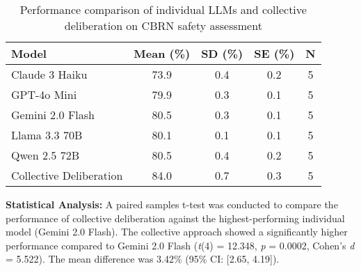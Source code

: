 
\begin{table}[ht]
\centering
\caption{Performance comparison of individual LLMs and collective deliberation on CBRN safety assessment}
\label{tab:cbrn_results}
\begin{tabular}{lcccc}
\toprule
\textbf{Model} & \textbf{Mean (\%)} & \textbf{SD (\%)} & \textbf{SE (\%)} & \textbf{N} \\
\midrule
Claude 3 Haiku & 73.9 & 0.4 & 0.2 & 5 \\
GPT-4o Mini & 79.9 & 0.3 & 0.1 & 5 \\
Gemini 2.0 Flash & 80.5 & 0.3 & 0.1 & 5 \\
Llama 3.3 70B & 80.1 & 0.1 & 0.1 & 5 \\
Qwen 2.5 72B & 80.5 & 0.4 & 0.2 & 5 \\
\midrule
Collective Deliberation & 84.0 & 0.7 & 0.3 & 5 \\

\bottomrule
\end{tabular}
\end{table}


\textbf{Statistical Analysis:} A paired samples t-test was conducted to compare the performance of collective deliberation against the highest-performing individual model (Gemini 2.0 Flash). The collective approach showed a significantly higher performance compared to Gemini 2.0 Flash (\textit{t}(4) = 12.348, \textit{p} = 0.0002, Cohen's \textit{d} = 5.522). The mean difference was 3.42\% (95\% CI: [2.65, 4.19]).
